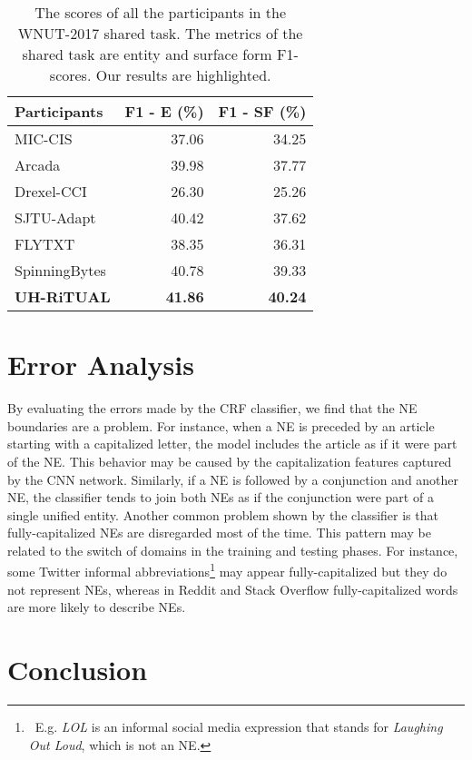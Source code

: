 \documentclass[11pt,letterpaper]{article}
\begin{document}
\begin{table}
 \small
\centering
\begin{tabular}{|l|r|r|}
\hline 
\bf Participants & 
\bf F1 - E (\%) & 
\bf F1 - SF (\%) \\ 
\hline
\hline
MIC-CIS         & 37.06 & 34.25 \\ 
Arcada          & 39.98 & 37.77 \\ 
Drexel-CCI      & 26.30 & 25.26 \\ 
SJTU-Adapt      & 40.42 & 37.62 \\ 
FLYTXT          & 38.35 & 36.31 \\ 
SpinningBytes   & 40.78 & 39.33 \\ 
\bf{UH-RiTUAL}  & \bf{41.86} & \bf{40.24} \\
\hline
\end{tabular}
\caption{\small  \label{all-scores} The scores of all the participants in the WNUT-2017 shared task. The metrics of the shared task are entity and surface form F1-scores. Our results are highlighted. }
\end{table}

\section{Error Analysis}

By evaluating the errors made by the CRF classifier, we find that the NE boundaries are a problem. For instance, when a NE is preceded by an article starting with a capitalized letter, the model includes the article as if it were part of the NE. This behavior may be caused by the capitalization features captured by the CNN network. Similarly, if a NE is followed by a conjunction and another NE, the classifier tends to join both NEs as if the conjunction were part of a single unified entity. Another common problem shown by the classifier is that fully-capitalized NEs are disregarded most of the time. This pattern may be related to the switch of domains in the training and testing phases. For instance, some Twitter informal abbreviations\footnote{~E.g. \textit{LOL} is an informal social media expression that stands for \textit{Laughing Out Loud}, which is not an NE.} may appear fully-capitalized but they do not represent NEs, whereas in Reddit and Stack Overflow fully-capitalized words are more likely to describe NEs.

\section{Conclusion}
\end{document}
